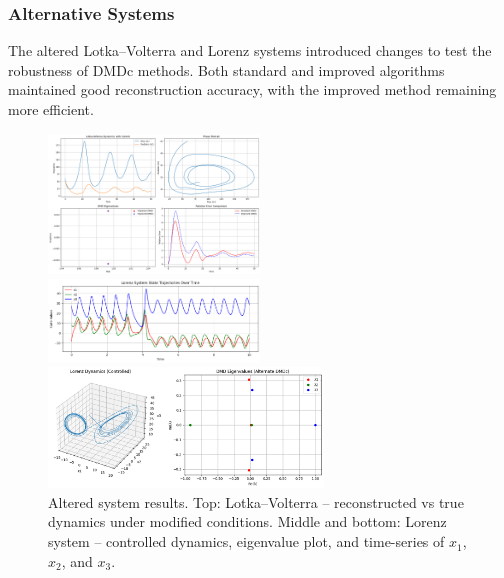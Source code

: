\documentclass[a4paper,12pt]{report}
\theoremstyle{definition}
\numberwithin{equation}{section}
\begin{document}
\newpage
\subsubsection*{Alternative Systems}

The altered Lotka–Volterra and Lorenz systems introduced changes to test the robustness of DMDc methods. Both standard and improved algorithms maintained good reconstruction accuracy, with the improved method remaining more efficient\cite{swaminathan2022}.
\begin{figure}[h!]
    \centering
    \includegraphics[width=0.5\textwidth]{Alter lv.png}
    
    \vspace{1em}
    
    \includegraphics[width=0.5\textwidth]{ALTER LODE.png}
    
    \vspace{1em}
    
    \includegraphics[width=0.65\textwidth]{ALTER L.png}
    
    \caption{Altered system results. Top: Lotka–Volterra – reconstructed vs true dynamics under modified conditions. Middle and bottom: Lorenz system – controlled dynamics, eigenvalue plot, and time-series of $x_1$, $x_2$, and $x_3$.}
\end{figure}\\
\end{document}

